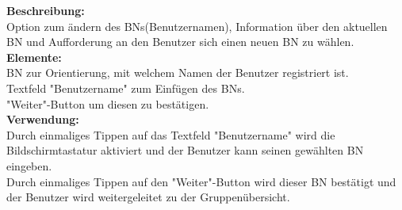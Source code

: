 \textbf{Beschreibung:}\\
Option zum ändern des BNs(Benutzernamen), Information über den aktuellen BN und Aufforderung an den Benutzer sich einen neuen BN zu wählen.\\
\textbf{Elemente:}\\
BN zur Orientierung, mit welchem Namen der Benutzer registriert ist.\\
Textfeld "Benutzername" zum Einfügen des BNs.\\
"Weiter"-Button um diesen zu bestätigen.\\
\textbf{Verwendung:}\\
Durch einmaliges Tippen auf das Textfeld "Benutzername" wird die Bildschirmtastatur aktiviert und der Benutzer kann seinen gewählten BN eingeben.\\
Durch einmaliges Tippen auf den "Weiter"-Button wird dieser BN bestätigt und der Benutzer wird weitergeleitet zu der Gruppenübersicht.
